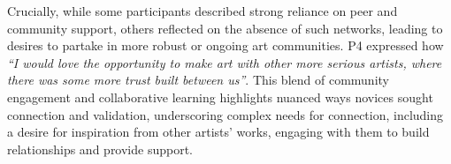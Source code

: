 Crucially, while some participants described strong reliance on peer and community support, others reflected on the absence of such networks, leading to desires to partake in more robust or ongoing art communities.
P4 expressed how \textit{``I would love the opportunity to make art with other more serious artists, where there was some more trust built between us''}. 
This blend of community engagement and collaborative learning highlights nuanced ways novices sought connection and validation, underscoring complex needs for connection, including a desire for inspiration from other artists' works, engaging with them to build relationships and provide support. 



